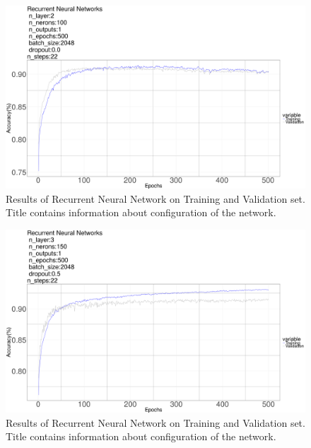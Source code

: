 \documentclass[a4paper]{article}
\begin{document}
\begin{figure}  
\centering
\includegraphics[width=1.0\textwidth]{RNN_3.png}
\caption{\label{fig:RNN_3}Results of Recurrent Neural Network on Training and Validation set. Title contains information about configuration of the network.}
\end{figure}

\begin{figure}  
\centering
\includegraphics[width=1.0\textwidth]{RNN_4.png}
\caption{\label{fig:RNN_4}Results of Recurrent Neural Network on Training and Validation set. Title contains information about configuration of the network.}
\end{figure}
\end{document}
